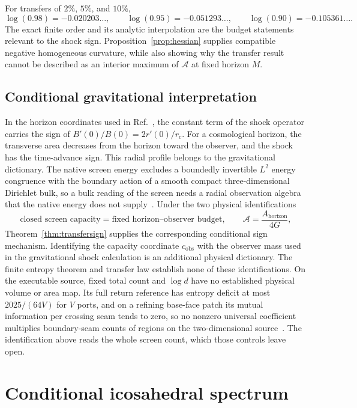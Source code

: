 \documentclass[11pt]{article}
\theoremstyle{remark}
\begin{document}
For transfers of \(2\%\), \(5\%\), and \(10\%\),
\[
\log(0.98)=-0.020203\ldots,\qquad
\log(0.95)=-0.051293\ldots,\qquad
\log(0.90)=-0.105361\ldots.
\]
The exact finite order and its analytic interpolation are the budget statements
relevant to the shock sign. Proposition~\ref{prop:hessian} supplies compatible
negative homogeneous curvature, while also showing why the transfer result
cannot be described as an interior maximum of \(\mathcal A\) at fixed
horizon \(M\).

\subsection{Conditional gravitational interpretation}

In the horizon coordinates used in
Ref.~\cite{chenStanfordTangYang2026}, the constant term of the shock operator
carries the sign of \(B'(0)/B(0)=2r'(0)/r_c\). For a cosmological horizon,
the transverse area decreases from the horizon toward the observer, and the
shock has the time-advance sign. This radial profile belongs to the
gravitational dictionary. The native screen energy excludes a boundedly
invertible \(L^2\) energy congruence with the boundary action of a smooth
compact three-dimensional Dirichlet bulk, so a bulk reading of the screen
needs a radial observation algebra that the native energy does not
supply~\cite{ophcontinuum}. Under the two physical identifications
\[
\text{closed screen capacity}=\text{fixed horizon--observer budget},
\qquad
\mathcal A=\frac{A_{\mathrm{horizon}}}{4G},
\]
Theorem~\ref{thm:transfersign} supplies the corresponding conditional sign
mechanism. Identifying the capacity coordinate \(c_{\mathrm{obs}}\) with the
observer mass used in the gravitational shock calculation is an additional
physical dictionary. The finite entropy theorem and transfer law establish
none of these identifications. On the executable source, fixed total count and
\(\log d\) have no established physical volume or area map. Its full return
reference has entropy deficit at most \(2025/(64V)\) for \(V\) ports, and on
a refining base-face patch its mutual information per crossing seam tends to
zero, so no nonzero universal coefficient multiplies boundary-seam counts of
regions on the two-dimensional source~\cite{ophentropy}. The identification
above reads the whole screen count, which those controls leave open.

\section{Conditional icosahedral spectrum}
\label{sec:spectrum}
\end{document}
